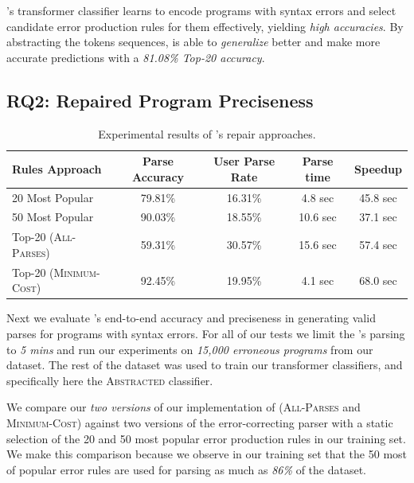 \begin{framed}
  \noindent \toolname's transformer classifier learns to encode programs with
  syntax errors and select candidate error production rules for them
  effectively, yielding \emph{high accuracies}. By abstracting the tokens
  sequences, \toolname is able to \emph{generalize} better and make more
  accurate predictions with a \emph{81.08\% Top-20 accuracy}.
\end{framed}


\subsection{RQ2: Repaired Program Preciseness}
\label{sec:eval:precise}

\begin{table}[t]
  \centering
  \begin{tabular}{l||cccc}
    Rules Approach                 & Parse Accuracy & User Parse Rate & Parse time & Speedup \\
    \hline
    20 Most Popular                & 79.81\% & 16.31\% & 4.8 sec  & 45.8 sec \\
    50 Most Popular                & 90.03\% & 18.55\% & 10.6 sec & 37.1 sec \\
    Top-20 (\textsc{All-Parses})   & 59.31\% & 30.57\% & 15.6 sec & 57.4 sec \\
    Top-20 (\textsc{Minimum-Cost}) & 92.45\% & 19.95\% & 4.1 sec  & 68.0 sec \\
  \end{tabular}
  \caption{Experimental results of \toolname's repair approaches.}
  \label{tab:seq2parse_full_results}
\end{table}

Next we evaluate \toolname's end-to-end accuracy and preciseness in generating
valid parses for programs with syntax errors. For all of our tests we limit the
\toolname's parsing to \emph{5 mins} and run our experiments on \emph{15,000
erroneous programs} from our dataset. The rest of the dataset was used to train
our transformer classifiers, and specifically here the \textsc{Abstracted}
classifier.

We compare our \emph{two versions} of our implementation of \toolname
(\textsc{All-Parses} and \textsc{Minimum-Cost}) against two versions of the
error-correcting parser with a static selection of the 20 and 50 most popular
error production rules in our training set. We make this comparison because we
observe in our training set that the 50 most of popular error rules are used for
parsing as much as \emph{86\%} of the dataset.

